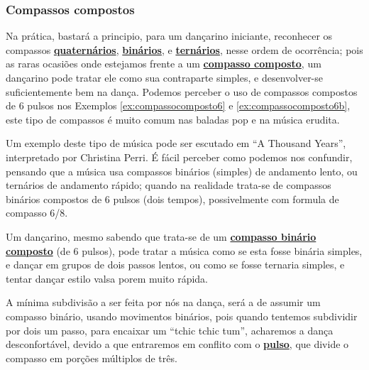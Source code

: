 \subsubsection{Compassos compostos}
Na prática, bastará a principio, para um dançarino iniciante,
reconhecer os compassos \hyperref[subsec:compassoquaternario]{\textbf{quaternários}}, 
\hyperref[subsec:compassobinario]{\textbf{binários}}, e 
\hyperref[subsec:compassoternario]{\textbf{ternários}},
nesse ordem de ocorrência;
pois as raras ocasiões onde estejamos frente a um \hyperref[sec:compaso]{\textbf{compasso composto}},
um dançarino pode tratar ele como sua contraparte simples,
e desenvolver-se suficientemente bem na dança. 
Podemos perceber o uso de compassos compostos de 6 pulsos nos Exemplos \ref{ex:compassocomposto6}
e \ref{ex:compassocomposto6b},
este tipo de compassos é muito comum nas baladas pop e na música erudita.
\begin{example}
\label{ex:compassocomposto6}
Um exemplo deste tipo de música pode ser escutado em ``A Thousand Years'', 
interpretado por Christina Perri. É fácil perceber como podemos nos confundir,
pensando que a música usa compassos binários (simples) de andamento lento,
ou ternários de andamento rápido; quando na realidade trata-se de compassos binários compostos de 6 pulsos (dois tempos),
possivelmente com formula de compasso 6/8.

Um dançarino, mesmo sabendo que trata-se de um \hyperref[compasso:binario]{\textbf{compasso binário composto}} (de 6 pulsos),
pode tratar a música como se esta fosse binária simples, e dançar em grupos de dois passos lentos,
ou como se fosse ternaria simples, e tentar dançar estilo valsa porem muito rápida.

A mínima subdivisão a ser feita por nós na dança, 
será a de assumir um compasso binário, usando movimentos binários,
pois quando tentemos subdividir por dois um passo, para encaixar um ``tchic tchic tum'',
acharemos a dança desconfortável, devido a que
entraremos em conflito com o \hyperref[ref:Pulso]{\textbf{pulso}}, 
que divide o compasso em porções múltiplos de três.
  
\end{example}

